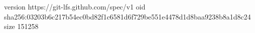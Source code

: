version https://git-lfs.github.com/spec/v1
oid sha256:03203b6c217b54ec0bd82f1c6581d6f729be551e4478d1d8baa9238b8a1d8c24
size 151258
